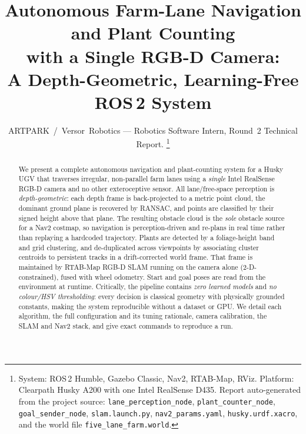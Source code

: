 \documentclass[10pt,journal,twoside]{IEEEtran}
\begin{document}
\title{Autonomous Farm-Lane Navigation and Plant Counting\\ with a Single RGB-D Camera:\\ A Depth-Geometric, Learning-Free ROS\,2 System}

\author{ARTPARK~/~Versor~Robotics --- Robotics Software Intern, Round~2 Technical Report.%
\thanks{System: ROS\,2 Humble, Gazebo Classic, Nav2, RTAB-Map, RViz. Platform: Clearpath Husky A200 with one Intel RealSense D435. Report auto-generated from the project source: \texttt{lane\_perception\_node}, \texttt{plant\_counter\_node}, \texttt{goal\_sender\_node}, \texttt{slam.launch.py}, \texttt{nav2\_params.yaml}, \texttt{husky.urdf.xacro}, and the world file \texttt{five\_lane\_farm.world}.}}


\maketitle

\begin{abstract}
We present a complete autonomous navigation and plant-counting system for a Husky UGV that traverses irregular, non-parallel farm lanes using a \emph{single} Intel RealSense RGB-D camera and no other exteroceptive sensor. All lane/free-space perception is \emph{depth-geometric}: each depth frame is back-projected to a metric point cloud, the dominant ground plane is recovered by RANSAC, and points are classified by their signed height above that plane. The resulting obstacle cloud is the \emph{sole} obstacle source for a Nav2 costmap, so navigation is perception-driven and re-plans in real time rather than replaying a hardcoded trajectory. Plants are detected by a foliage-height band and grid clustering, and de-duplicated across viewpoints by associating cluster centroids to persistent tracks in a drift-corrected world frame. That frame is maintained by RTAB-Map RGB-D SLAM running on the camera alone (2-D-constrained), fused with wheel odometry. Start and goal poses are read from the environment at runtime. Critically, the pipeline contains \emph{zero learned models} and \emph{no colour/HSV thresholding}: every decision is classical geometry with physically grounded constants, making the system reproducible without a dataset or GPU. We detail each algorithm, the full configuration and its tuning rationale, camera calibration, the SLAM and Nav2 stack, and give exact commands to reproduce a run.
\end{abstract}
\end{document}
